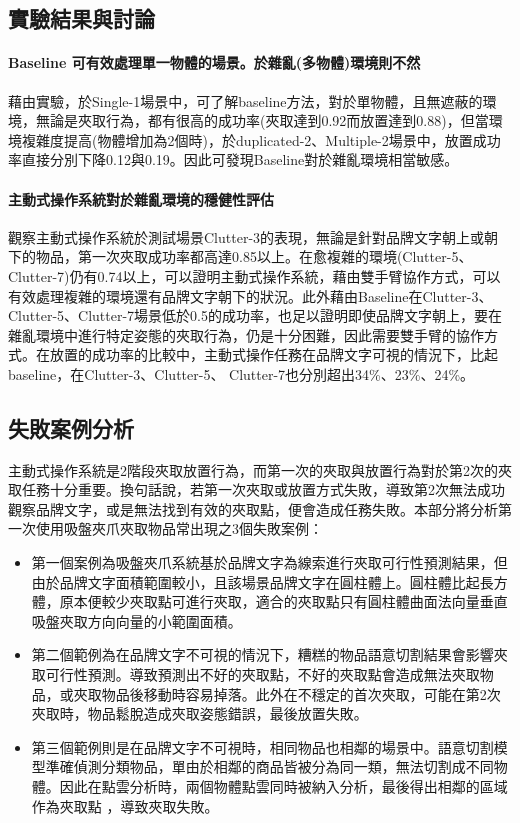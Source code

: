 \subsection{實驗結果與討論}

\paragraph{Baseline 可有效處理單一物體的場景。於雜亂(多物體)環境則不然}
藉由實驗，於Single-1場景中，可了解baseline方法，對於單物體，且無遮蔽的環境，無論是夾取行為，都有很高的成功率(夾取達到0.92而放置達到0.88)，但當環境複雜度提高(物體增加為2個時)，於duplicated-2、Multiple-2場景中，放置成功率直接分別下降0.12與0.19。因此可發現Baseline對於雜亂環境相當敏感。

\paragraph{主動式操作系統對於雜亂環境的穩健性評估}
觀察主動式操作系統於測試場景Clutter-3的表現，無論是針對品牌文字朝上或朝下的物品，第一次夾取成功率都高達0.85以上。在愈複雜的環境(Clutter-5、Clutter-7)仍有0.74以上，可以證明主動式操作系統，藉由雙手臂協作方式，可以有效處理複雜的環境還有品牌文字朝下的狀況。此外藉由Baseline在Clutter-3、Clutter-5、Clutter-7場景低於0.5的成功率，也足以證明即使品牌文字朝上，要在雜亂環境中進行特定姿態的夾取行為，仍是十分困難，因此需要雙手臂的協作方式。在放置的成功率的比較中，主動式操作任務在品牌文字可視的情況下，比起baseline，在Clutter-3、Clutter-5、 Clutter-7也分別超出34\%、23\%、24\%。

\subsection{失敗案例分析}
主動式操作系統是2階段夾取放置行為，而第一次的夾取與放置行為對於第2次的夾取任務十分重要。換句話說，若第一次夾取或放置方式失敗，導致第2次無法成功觀察品牌文字，或是無法找到有效的夾取點，便會造成任務失敗。本部分將分析第一次使用吸盤夾爪夾取物品常出現之3個失敗案例：
\begin{itemize}
\item 第一個案例為吸盤夾爪系統基於品牌文字為線索進行夾取可行性預測結果，但由於品牌文字面積範圍較小，且該場景品牌文字在圓柱體上。圓柱體比起長方體，原本便較少夾取點可進行夾取，適合的夾取點只有圓柱體曲面法向量垂直吸盤夾取方向向量的小範圍面積。
\item 第二個範例為在品牌文字不可視的情況下，糟糕的物品語意切割結果會影響夾取可行性預測。導致預測出不好的夾取點，不好的夾取點會造成無法夾取物品，或夾取物品後移動時容易掉落。此外在不穩定的首次夾取，可能在第2次夾取時，物品鬆脫造成夾取姿態錯誤，最後放置失敗。
\item 第三個範例則是在品牌文字不可視時，相同物品也相鄰的場景中。語意切割模型準確偵測分類物品，單由於相鄰的商品皆被分為同一類，無法切割成不同物體。因此在點雲分析時，兩個物體點雲同時被納入分析，最後得出相鄰的區域作為夾取點
，導致夾取失敗。
\end{itemize}



